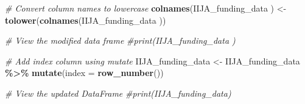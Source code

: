 \documentclass[
]{article}
\newenvironment{Shaded}{\begin{snugshade}}{\end{snugshade}}
\newcommand{\AttributeTok}[1]{\textcolor[rgb]{0.13,0.29,0.53}{#1}}
\newcommand{\CommentTok}[1]{\textcolor[rgb]{0.56,0.35,0.01}{\textit{#1}}}
\newcommand{\FunctionTok}[1]{\textcolor[rgb]{0.13,0.29,0.53}{\textbf{#1}}}
\newcommand{\NormalTok}[1]{#1}
\newcommand{\OtherTok}[1]{\textcolor[rgb]{0.56,0.35,0.01}{#1}}
\newcommand{\SpecialCharTok}[1]{\textcolor[rgb]{0.81,0.36,0.00}{\textbf{#1}}}
\newcommand{\StringTok}[1]{\textcolor[rgb]{0.31,0.60,0.02}{#1}}
\begin{document}
\begin{Shaded}
\begin{Highlighting}[]
\CommentTok{\# Convert column names to lowercase}
\FunctionTok{colnames}\NormalTok{(IIJA\_funding\_data ) }\OtherTok{\textless{}{-}} \FunctionTok{tolower}\NormalTok{(}\FunctionTok{colnames}\NormalTok{(IIJA\_funding\_data ))}

\CommentTok{\# View the modified data frame}
\CommentTok{\#print(IIJA\_funding\_data )}
\end{Highlighting}
\end{Shaded}

\begin{Shaded}
\end{Shaded}

\begin{Shaded}
\end{Shaded}

\begin{Shaded}
\begin{Highlighting}[]
\CommentTok{\# Add index column using mutate}
\NormalTok{IIJA\_funding\_data }\OtherTok{\textless{}{-}}\NormalTok{ IIJA\_funding\_data }\SpecialCharTok{\%\textgreater{}\%} \FunctionTok{mutate}\NormalTok{(}\AttributeTok{index =} \FunctionTok{row\_number}\NormalTok{())}

\CommentTok{\# View the updated DataFrame}
\CommentTok{\#print(IIJA\_funding\_data)}
\end{Highlighting}
\end{Shaded}
\end{document}
